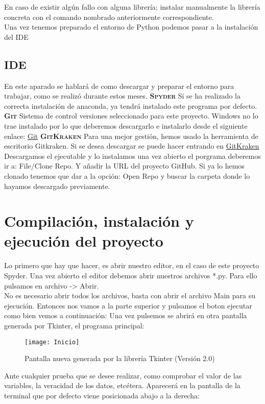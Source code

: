 En caso de existir algún fallo con alguna librería; instalar manualmente la librería concreta con el comando nombrado anteriormente correspondiente.\\
Una vez tenemos preparado el entorno de Python podemos pasar a la instalación del IDE
\subsection{IDE}
En este aparado se hablará de como descargar y preparar el entorno para trabajar, como se realizó durante estos meses.
\textbf{\textsc{Spyder}}
Si se ha realizado la correcta instalación de anaconda, ya tendrá instalado este programa por defecto.
\textbf{\textsc{Git}}
Sistema de control versiones seleccionado para este proyecto. Windows no lo trae instalado por lo que deberemos descargarlo e instalarlo desde el siguiente enlace: \href{https://git-scm.com/}{Git}
\textbf{\textsc{GitKraken}}
Para una mejor gestión, hemos usado la herramienta de escritorio Gitkraken. Si se desea descargar se puede hacer entrando en \href{https://gitkraken.com/}{GitKraken}
Descargamos el ejecutable y lo instalamos una vez abierto el porgrama deberemos ir a: File/Clone Repo. Y añadir la URL del proyecto GitHub. Si ya lo hemos clonado tenemos que dar a la opción: Open Repo y buscar la carpeta donde lo hayamos descargado previamente.
\section{Compilación, instalación y ejecución del proyecto}
Lo primero que hay que hacer, es abrir nuestro editor, en el caso de este proyecto Spyder. Una vez abierto el editor debemos abrir nuestros archivos *.py. Para ello pulsamos en archivo -> Abrir.\\
No es necesario abrir todos los archivos, basta con abrir el archivo Main para su ejecución. Entonces nos vamos a la parte superior y pulsamos el boton ejecutar como bien vemos a continuación:
Una vez pulsemos se abrirá en otra pantalla generada por Tkinter, el programa principal:
\begin{figure}[htb]
\centering
\texttt{[image: Inicio]} 
\caption{Pantalla nueva generada por la librería Tkinter (Versión 2.0)}
\end{figure}
Ante cualquier prueba que se desee realizar, como comprobar el valor de las variables, la veracidad de los datos, etcétera. Aparecerá en la pantalla de la terminal que por defecto viene posicionada abajo a la derecha:
